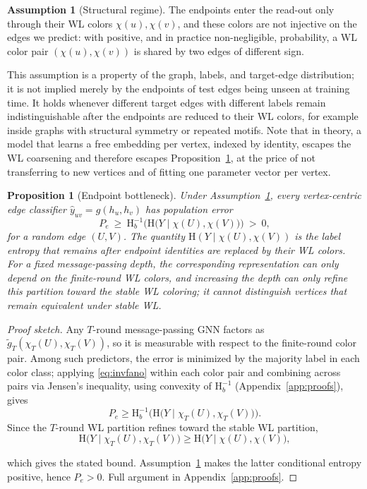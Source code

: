 \documentclass[sigconf]{acmart}
\newcommand{\Hh}{\mathrm{H}}
\theoremstyle{plain}
\newtheorem{proposition}{Proposition}
\theoremstyle{definition}
\newtheorem{assumption}{Assumption}
\begin{document}
\begin{assumption}[Structural regime]
\label{as:structural}
The endpoints enter the read-out only through their WL colors $\chi(u),\chi(v)$, and these colors are not injective on the edges we predict: with positive, and in practice non-negligible, probability, a WL color pair $(\chi(u),\chi(v))$ is shared by two edges of different sign.
\end{assumption}

This assumption is a property of the graph, labels, and target-edge distribution; it is not implied merely by the endpoints of test edges being unseen at training time. It holds whenever different target edges with different labels remain indistinguishable after the endpoints are reduced to their WL colors, for example inside graphs with structural symmetry or repeated motifs. Note that in theory, a model that learns a free embedding per vertex, indexed by identity, escapes the WL coarsening and therefore escapes Proposition~\ref{prop:bottleneck}, at the price of not transferring to new vertices and of fitting one parameter vector per vertex.

\begin{proposition}[Endpoint bottleneck]
\label{prop:bottleneck}
Under Assumption~\ref{as:structural}, every vertex-centric edge classifier $\hat y_{uv}=g(h_u,h_v)$ has population error
\[
P_e \ \ge\ \Hh_b^{-1}\Big(\Hh\big(Y\mid \chi(U),\chi(V)\big)\Big)\ >\ 0,
\]
for a random edge $(U,V)$. The quantity $\Hh(Y\mid \chi(U),\chi(V))$ is the label entropy that remains after endpoint identities are replaced by their WL colors. For a fixed message-passing depth, the corresponding representation can only depend on the finite-round WL colors, and increasing the depth can only refine this partition toward the stable WL coloring; it cannot distinguish vertices that remain equivalent under stable WL.  
\end{proposition}

\begin{proof}[Proof sketch]
Any $T$-round message-passing GNN factors as $\tilde g_T(\chi_T(U),\chi_T(V))$, so it is measurable with respect to the finite-round color pair. Among such predictors, the error is minimized by the majority label in each color class; applying \eqref{eq:invfano} within each color pair and combining across pairs via Jensen's inequality, using convexity of $\Hh_b^{-1}$ (Appendix~\ref{app:proofs}), gives 
\begin{equation}   
P_e \ge \Hh_b^{-1}\Big(\Hh\big(Y\mid\chi_T(U),\chi_T(V)\big) \Big).
\end{equation}
Since the $T$-round WL partition refines toward the stable WL partition,
\begin{equation}   
\Hh\big(Y\mid\chi_T(U),\chi_T(V)\big) \ge \Hh\big(Y\mid\chi(U),\chi(V)\big),
\end{equation}

which gives the stated bound. Assumption~\ref{as:structural} makes the latter conditional entropy positive, hence $P_e>0$. Full argument in Appendix~\ref{app:proofs}.
\end{proof}
\end{document}
